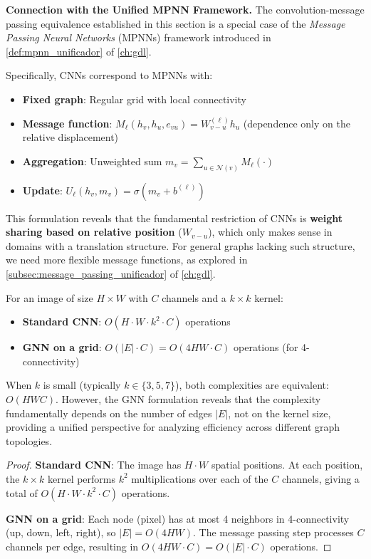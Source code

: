 \textbf{Connection with the Unified MPNN Framework.} The convolution-message passing equivalence established in this section is a special case of the \textit{Message Passing Neural Networks} (\glspl{MPNN}) framework introduced in \autoref{def:mpnn_unificador} of \autoref{ch:gdl}.

Specifically, CNNs correspond to MPNNs with:
\begin{itemize}
    \item \textbf{Fixed graph}: Regular grid with local connectivity
    \item \textbf{Message function}: $M_\ell(h_v, h_u, e_{vu}) = W_{v-u}^{(\ell)} h_u$ (dependence only on the relative displacement)
    \item \textbf{Aggregation}: Unweighted sum $m_v = \sum_{u \in \mathcal{N}(v)} M_\ell(\cdot)$
    \item \textbf{Update}: $U_\ell(h_v, m_v) = \sigma(m_v + b^{(\ell)})$
\end{itemize}

This formulation reveals that the fundamental restriction of CNNs is \textbf{weight sharing based on relative position} ($W_{v-u}$), which only makes sense in domains with a translation structure. For general graphs lacking such structure, we need more flexible message functions, as explored in \autoref{subsec:message_passing_unificador} of \autoref{ch:gdl}.

\begin{proposition}\label{prop:complejidad_cnn_vs_gnn_grilla}
For an image of size $H \times W$ with $C$ channels and a $k \times k$ kernel:
\begin{itemize}
    \item \textbf{Standard CNN}: $O(H \cdot W \cdot k^2 \cdot C)$ operations
    \item \textbf{GNN on a grid}: $O(|E| \cdot C) = O(4HW \cdot C)$ operations (for 4-connectivity)
\end{itemize}

When $k$ is small (typically $k \in \{3, 5, 7\}$), both complexities are equivalent: $O(HWC)$. However, the GNN formulation reveals that the complexity fundamentally depends on the number of edges $|E|$, not on the kernel size, providing a unified perspective for analyzing efficiency across different graph topologies.
\end{proposition}

\begin{proof}
\textbf{Standard CNN}: The image has $H \cdot W$ spatial positions. At each position, the $k \times k$ kernel performs $k^2$ multiplications over each of the $C$ channels, giving a total of $O(H \cdot W \cdot k^2 \cdot C)$ operations.

\textbf{GNN on a grid}: Each node (pixel) has at most 4 neighbors in 4-connectivity (up, down, left, right), so $|E| = O(4HW)$. The message passing step processes $C$ channels per edge, resulting in $O(4HW \cdot C) = O(|E| \cdot C)$ operations.
\end{proof}

